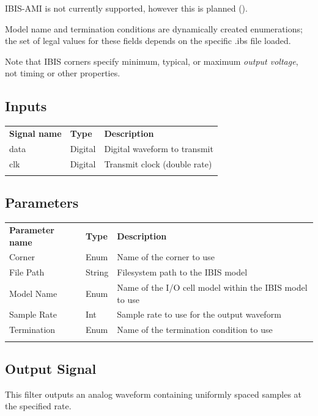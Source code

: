 IBIS-AMI is not currently supported, however this is planned ().

Model name and termination conditions are dynamically created enumerations; the set of legal values for these fields
depends on the specific .ibs file loaded.

Note that IBIS corners specify minimum, typical, or maximum \emph{output voltage}, not timing or other properties.

\subsection{Inputs}

\begin{tabularx}{16cm}{llX}
\thickhline
\textbf{Signal name} & \textbf{Type} & \textbf{Description} \\
\thickhline
data & Digital & Digital waveform to transmit\\
\thinhline
clk & Digital & Transmit clock (double rate)\\
\thickhline
\end{tabularx}

\subsection{Parameters}

\begin{tabularx}{16cm}{llX}
\thickhline
\textbf{Parameter name} & \textbf{Type} & \textbf{Description} \\
\thickhline
Corner & Enum & Name of the corner to use\\
\thinhline
File Path & String & Filesystem path to the IBIS model\\
\thinhline
Model Name & Enum & Name of the I/O cell model within the IBIS model to use\\
\thinhline
Sample Rate & Int & Sample rate to use for the output waveform\\
\thinhline
Termination & Enum & Name of the termination condition to use\\
\thickhline
\end{tabularx}

\subsection{Output Signal}

This filter outputs an analog waveform containing uniformly spaced samples at the specified rate.

